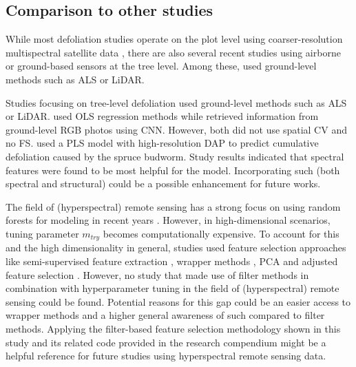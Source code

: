 \documentclass[peerreview]{IEEEtran}
\begin{document}
\subsection{Comparison to other studies}

While most defoliation studies operate on the plot level using coarser-resolution multispectral satellite data \cite{townsend2012, debeurs2008, rengarajan2016}, there are also several recent studies using airborne or ground-based sensors at the tree level.
Among these, \cite{meng2018, kalin2019} used ground-level methods such as \ac{ALS} or \ac{LiDAR}.

Studies focusing on tree-level defoliation used ground-level methods such as \ac{ALS} or \ac{LiDAR}\cite{meng2018, kalin2019}.
\cite{meng2018} used \ac{OLS} regression methods while \cite{kalin2019} retrieved information from ground-level RGB photos using \ac{CNN}.
However, both did not use spatial \ac{CV} and \cite{kalin2019} no \ac{FS}.
\cite{goodbody2018} used a \ac{PLS} model with high-resolution \ac{DAP} to predict cumulative defoliation caused by the spruce budworm.
Study results indicated that spectral features were found to be most helpful for the model.
Incorporating such (both spectral and structural) could be a possible enhancement for future works.

The field of (hyperspectral) remote sensing has a strong focus on using random forests for modeling in recent years \cite{belgiu2016}.
However, in high-dimensional scenarios, tuning parameter \texttt{\(m_{try}\)} becomes computationally expensive.
To account for this and the high dimensionality in general, studies used feature selection approaches like semi-supervised feature extraction \cite{xia2015}, wrapper methods \cite{fassnacht2014a, feng2016, georganos2018}, PCA and adjusted feature selection \cite{rochac2016}.
However, no study that made use of filter methods in combination with hyperparameter tuning in the field of (hyperspectral) remote sensing could be found.
Potential reasons for this gap could be an easier access to wrapper methods and a higher general awareness of such compared to filter methods.
Applying the filter-based feature selection methodology shown in this study and its related code provided in the research compendium might be a helpful reference for future studies using hyperspectral remote sensing data.
\end{document}
